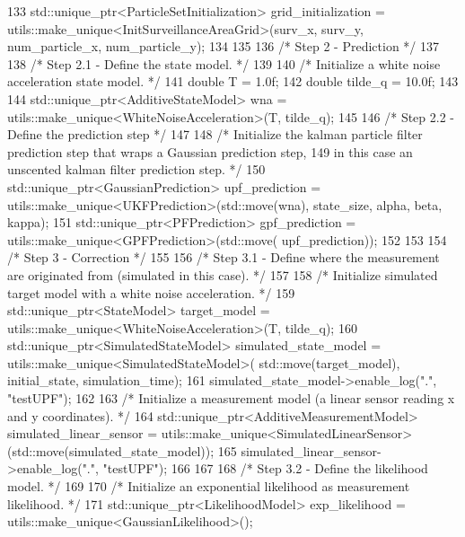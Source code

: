 \begin{DoxyCodeInclude}
133     std::unique\_ptr<ParticleSetInitialization> grid\_initialization = 
      utils::make\_unique<InitSurveillanceAreaGrid>(surv\_x, surv\_y, num\_particle\_x, num\_particle\_y);
134 
135 
136     \textcolor{comment}{/* Step 2 - Prediction */}
137 
138     \textcolor{comment}{/* Step 2.1 - Define the state model. */}
139 
140     \textcolor{comment}{/* Initialize a white noise acceleration state model. */}
141     \textcolor{keywordtype}{double} T = 1.0f;
142     \textcolor{keywordtype}{double} tilde\_q = 10.0f;
143 
144     std::unique\_ptr<AdditiveStateModel> wna = utils::make\_unique<WhiteNoiseAcceleration>(T, tilde\_q);
145 
146     \textcolor{comment}{/* Step 2.2 - Define the prediction step */}
147 
148     \textcolor{comment}{/* Initialize the kalman particle filter prediction step that wraps a Gaussian prediction step,}
149 \textcolor{comment}{       in this case an unscented kalman filter prediction step. */}
150     std::unique\_ptr<GaussianPrediction> upf\_prediction = utils::make\_unique<UKFPrediction>(std::move(wna), 
      state\_size, alpha, beta, kappa);
151     std::unique\_ptr<PFPrediction> gpf\_prediction = utils::make\_unique<GPFPrediction>(std::move(
      upf\_prediction));
152 
153 
154     \textcolor{comment}{/* Step 3 - Correction */}
155 
156     \textcolor{comment}{/* Step 3.1 - Define where the measurement are originated from (simulated in this case). */}
157 
158     \textcolor{comment}{/* Initialize simulated target model with a white noise acceleration. */}
159     std::unique\_ptr<StateModel> target\_model = utils::make\_unique<WhiteNoiseAcceleration>(T, tilde\_q);
160     std::unique\_ptr<SimulatedStateModel> simulated\_state\_model = utils::make\_unique<SimulatedStateModel>(
      std::move(target\_model), initial\_state, simulation\_time);
161     simulated\_state\_model->enable\_log(\textcolor{stringliteral}{"."}, \textcolor{stringliteral}{"testUPF"});
162 
163     \textcolor{comment}{/* Initialize a measurement model (a linear sensor reading x and y coordinates). */}
164     std::unique\_ptr<AdditiveMeasurementModel> simulated\_linear\_sensor = 
      utils::make\_unique<SimulatedLinearSensor>(std::move(simulated\_state\_model));
165     simulated\_linear\_sensor->enable\_log(\textcolor{stringliteral}{"."}, \textcolor{stringliteral}{"testUPF"});
166 
167 
168     \textcolor{comment}{/* Step 3.2 - Define the likelihood model. */}
169 
170     \textcolor{comment}{/* Initialize an exponential likelihood as measurement likelihood. */}
171     std::unique\_ptr<LikelihoodModel> exp\_likelihood = utils::make\_unique<GaussianLikelihood>();

\end{DoxyCodeInclude}
